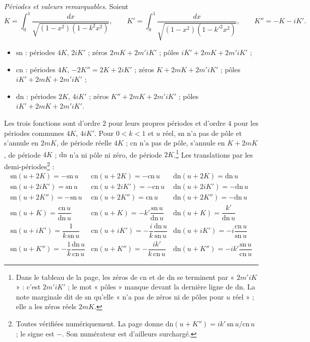 \documentclass[11pt,a4paper]{article}
\begin{document}
\emph{Périodes et valeurs remarquables.} Soient
\[
K = \int_0^1\frac{dx}{\sqrt{(1-x^2)(1-k^2x^2)}}, \qquad K' =
\int_0^1\frac{dx}{\sqrt{(1-x^2)(1-k'^2x^2)}}, \qquad K'' = -K - iK' .
\]
\begin{itemize}
\item $\mathrm{sn}$ : périodes $4K$, $2iK'$ ; zéros $2mK + 2m'iK'$ ; pôles $iK' +
2mK + 2m'iK'$ ;
\item $\mathrm{cn}$ : périodes $4K$, $-2K'' = 2K + 2iK'$ ; zéros $K + 2mK +
2m'iK'$ ; pôles $iK' + 2mK + 2m'iK'$ ;
\item $\mathrm{dn}$ : périodes $2K$, $4iK'$ ; zéros $K'' + 2mK + 2m'iK'$ ; pôles
$iK' + 2mK + 2m'iK'$.
\end{itemize}
Les trois fonctions sont d'ordre $2$ pour leurs propres périodes et d'ordre $4$
pour les périodes communes $4K$, $4iK'$. Pour $0 < k < 1$ et $u$ réel,
$\mathrm{sn}$ n'a pas de pôle et s'annule en $2mK$, de période réelle $4K$ ;
$\mathrm{cn}$ n'a pas de pôle, s'annule en $K + 2mK$, de période $4K$ ;
$\mathrm{dn}$ n'a ni pôle ni zéro, de période $2K$.\footnote{Dans le tableau de
la page, les zéros de $\mathrm{cn}$ et de $\mathrm{dn}$ se terminent par
« $2m'iK$ » : c'est $2m'iK'$ ; le mot « pôles » manque devant la dernière ligne
de $\mathrm{dn}$. La note marginale dit de $\mathrm{sn}$ qu'elle « n'a pas de
zéros ni de pôles pour $u$ réel » ; elle a les zéros réels $2mK$.} Les
translations par les demi-périodes\footnote{Toutes vérifiées numériquement. La page donne $\mathrm{dn}(u+K'') =
ik'\,\mathrm{sn}\,u/\mathrm{cn}\,u$ ; le signe est $-$. Son numérateur est
d'ailleurs surchargé.} :
\[
\begin{array}{lll}
\mathrm{sn}(u+2K) = -\mathrm{sn}\,u & \mathrm{cn}(u+2K) = -\mathrm{cn}\,u &
\mathrm{dn}(u+2K) = \mathrm{dn}\,u \\
\mathrm{sn}(u+2iK') = \mathrm{sn}\,u & \mathrm{cn}(u+2iK') = -\mathrm{cn}\,u &
\mathrm{dn}(u+2iK') = -\mathrm{dn}\,u \\
\mathrm{sn}(u+2K'') = -\mathrm{sn}\,u & \mathrm{cn}(u+2K'') = \mathrm{cn}\,u &
\mathrm{dn}(u+2K'') = -\mathrm{dn}\,u \\[1ex]
\mathrm{sn}(u+K) = \dfrac{\mathrm{cn}\,u}{\mathrm{dn}\,u} & \mathrm{cn}(u+K) =
-k'\dfrac{\mathrm{sn}\,u}{\mathrm{dn}\,u} & \mathrm{dn}(u+K) =
\dfrac{k'}{\mathrm{dn}\,u} \\[2ex]
\mathrm{sn}(u+iK') = \dfrac{1}{k\,\mathrm{sn}\,u} & \mathrm{cn}(u+iK') =
-\dfrac ik\dfrac{\mathrm{dn}\,u}{\mathrm{sn}\,u} & \mathrm{dn}(u+iK') =
-i\dfrac{\mathrm{cn}\,u}{\mathrm{sn}\,u} \\[2ex]
\mathrm{sn}(u+K'') = -\dfrac1k\dfrac{\mathrm{dn}\,u}{\mathrm{cn}\,u} &
\mathrm{cn}(u+K'') = -\dfrac{ik'}{k\,\mathrm{cn}\,u} & \mathrm{dn}(u+K'') =
-ik'\dfrac{\mathrm{sn}\,u}{\mathrm{cn}\,u}
\end{array}
\]
\end{document}
